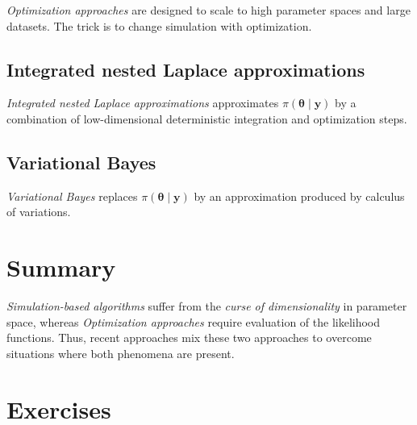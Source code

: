\textit{Optimization approaches} are designed to scale to high parameter spaces and large datasets. The trick is to change simulation with optimization. 

\subsection{Integrated nested Laplace approximations}\label{sec15_21}
\textit{Integrated nested Laplace approximations} approximates $\pi(\boldsymbol{\theta} \mid \mathbf{y})$ by a combination of low-dimensional deterministic integration and optimization steps. 

\subsection{Variational Bayes}\label{sec15_22}
\textit{Variational Bayes} replaces $\pi(\boldsymbol{\theta} \mid \mathbf{y})$ by an approximation produced by calculus of variations. 

\section{Summary}\label{sec15_3}
\textit{Simulation-based algorithms} suffer from the \textit{curse of dimensionality} in parameter space, whereas \textit{Optimization approaches} require evaluation of the likelihood functions. Thus, recent approaches mix these two approaches to overcome situations where both phenomena are present.

\section{Exercises}\label{sec15_4}

